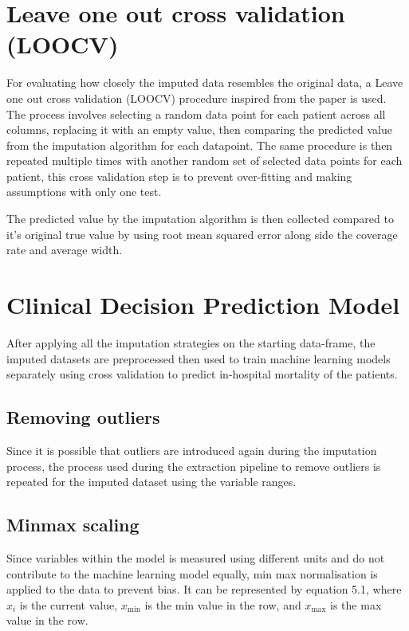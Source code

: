 \documentclass{l4proj}
\begin{document}
\section{Leave one out cross validation (LOOCV)}

For evaluating how closely the imputed data resembles the original data, a Leave one out cross validation (LOOCV) procedure inspired from the paper \cite{Nijman2021} is used. The process involves selecting a random data point for each patient across all columns, replacing it with an empty value, then comparing the predicted value from the imputation algorithm for each datapoint. The same procedure is then repeated multiple times with another random set of selected data points for each patient, this cross validation step is to prevent over-fitting and making assumptions with only one test. 

The predicted value by the imputation algorithm is then collected compared to it's original true value by using root mean squared error along side the coverage rate and average width.

 
 
\section{Clinical Decision Prediction Model}
After applying all the imputation strategies on the starting data-frame, the imputed datasets are preprocessed then used to train machine learning models separately using cross validation to predict in-hospital mortality of the patients.

\subsection{Removing outliers }
Since it is possible that outliers are introduced again during the imputation process, the process used during the extraction pipeline to remove outliers is repeated for the imputed dataset using the variable ranges.

\subsection{Minmax scaling}

Since variables within the model is measured using different units and do not contribute to the machine learning model equally, min max normalisation is applied to the data to prevent bias. It can be represented by equation 5.1, where \({x}_i\) is the current value, \(x_\text{min}\) is the min value in the row, and \(x_\text{max}\) is the max value in the row.
\end{document}
